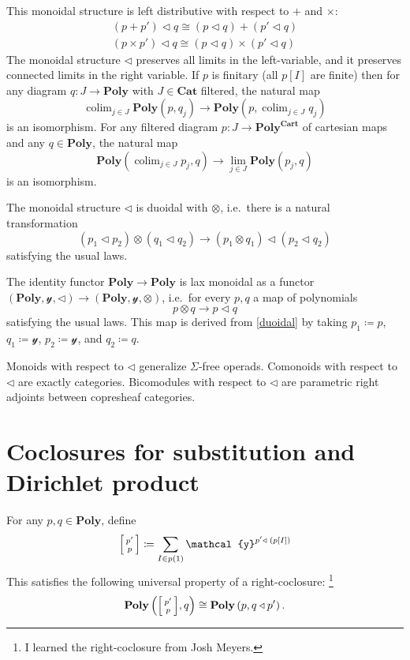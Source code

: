 \documentclass[11pt, one side, article]{memoir}
\makeatletter
\theoremstyle{definition}
\theoremstyle{plain}
\DeclareMathOperator*{\colim}{colim}
\newcommand{\Cat}[1]{\mathbf{#1}}%
\newcommand{\too}{\longrightarrow}
\newcommand{\smcat}{\Cat{Cat}}
\newcommand{\yon}{\mathcal{y}}
\newcommand{\poly}{\Cat{Poly}}
\newcommand{\polycart}{\poly^{\Cat{Cart}}}
\newcommand{\0}{\textsf{0}}
\newcommand{\1}{\tn{\textsf{1}}}
\newcommand{\tri}{\mathbin{\triangleleft}}
\newcommand{\bigcocl}[2]{
     \begin{bmatrix}{\vphantom{f_f^f}#2} \\ {\vphantom{f_f^f}#1} \end{bmatrix}
}
\newcommand{\littlecocl}[2]{
     \begin{bsmallmatrix}{\vphantom{f}#2} \\ {\vphantom{f}#1} \end{bsmallmatrix}
}
\newcommand{\cocr}[2]{
  \relax\if@display
     \bigcocl{#1}{#2}
  \else
     \littlecocl{#1}{#2}
  \fi
}
\makeatother
\begin{document}
This monoidal structure is left distributive with respect to $+$ and $\times$:
\begin{align}
	(p+p')\tri q\cong (p\tri q)+(p'\tri q)\label{eqn.comp_plus}\\
	(p\times p')\tri q\cong (p\tri q)\times(p'\tri q)\label{eqn.comp_times}
\end{align}
The monoidal structure $\tri$ preserves all limits in the left-variable, and it preserves connected limits in the right variable. If $p$ is finitary (all $p[I]$ are finite) then for any diagram $q\colon J\to\poly$ with $J\in\smcat$ filtered, the natural map
\begin{equation}
\colim_{j\in J}\poly(p,q_j)\to\poly(p,\colim_{j\in J}q_j)
\end{equation}
is an isomorphism. For any filtered diagram $p\colon J\to\polycart$ of cartesian maps and any $q\in\poly$, the natural map
\begin{equation}
\poly(\colim_{j\in J}p_j,q)\to\lim_{j\in J}\poly(p_j,q)
\end{equation}
is an isomorphism.

The monoidal structure $\tri$ is duoidal with $\otimes$, i.e.\ there is a natural transformation
\begin{equation}\label{duoidal}
	(p_1\tri p_2)\otimes(q_1\tri q_2)\too(p_1\otimes q_1)\tri(p_2\tri q_2)
\end{equation}
satisfying the usual laws.

The identity functor $\poly\to\poly$ is lax monoidal as a functor $(\poly,\yon,\tri)\to(\poly,\yon,\otimes)$, i.e.\ for every $p,q$ a map of polynomials
\begin{equation}
	p\otimes q\to p\tri q
\end{equation}
satisfying the usual laws. This map is derived from \eqref{duoidal} by taking $p_1\coloneqq p$, $q_1\coloneqq\yon$, $p_2\coloneqq\yon$, and $q_2\coloneqq q$. 

Monoids with respect to $\tri$ generalize $\Sigma$-free operads. Comonoids with respect to $\tri$ are exactly categories. Bicomodules with respect to $\tri$ are parametric right adjoints between copresheaf categories.


\chapter{Coclosures for substitution and Dirichlet product}

For any $p,q\in\poly$, define
\begin{equation}
\cocr{p}{p'}\coloneqq\sum_{I\in p(1)}\yon^{p'\tri\; (p[I])}
\end{equation}
This satisfies the following universal property of a right-coclosure:%
\footnote{I learned the right-coclosure from Josh Meyers.}
\begin{equation}
	\poly\left(\cocr{p}{p'},q\right)\cong\poly\left(p,q\tri p'\right).
\end{equation}
\end{document}
